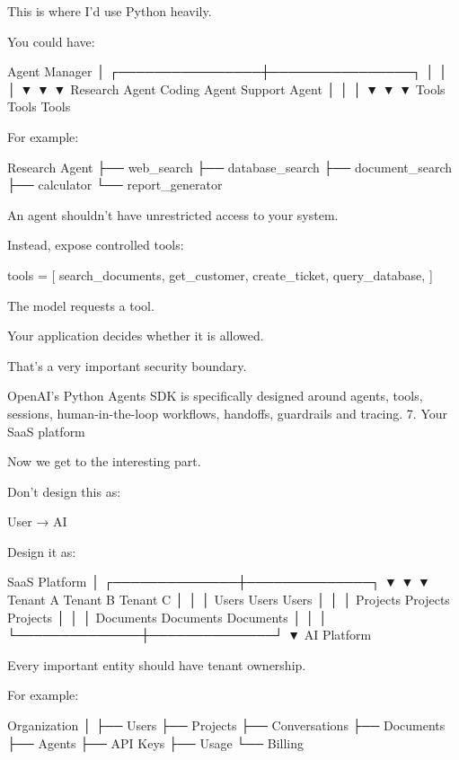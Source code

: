 This is where I'd use Python heavily.

You could have:

                    Agent Manager
                         │
        ┌────────────────┼────────────────┐
        │                │                │
        ▼                ▼                ▼
  Research Agent   Coding Agent     Support Agent
        │                │                │
        ▼                ▼                ▼
     Tools            Tools            Tools

For example:

Research Agent
 ├── web_search
 ├── database_search
 ├── document_search
 ├── calculator
 └── report_generator

An agent shouldn't have unrestricted access to your system.

Instead, expose controlled tools:

tools = [
    search_documents,
    get_customer,
    create_ticket,
    query_database,
]

The model requests a tool.

Your application decides whether it is allowed.

That's a very important security boundary.

OpenAI's Python Agents SDK is specifically designed around agents, tools, sessions, human-in-the-loop workflows, handoffs, guardrails and tracing.
7. Your SaaS platform

Now we get to the interesting part.

Don't design this as:

User → AI

Design it as:

                    SaaS Platform
                         │
          ┌──────────────┼──────────────┐
          ▼              ▼              ▼
       Tenant A       Tenant B       Tenant C
          │              │              │
       Users          Users          Users
          │              │              │
       Projects       Projects       Projects
          │              │              │
       Documents      Documents      Documents
          │              │              │
          └──────────────┼──────────────┘
                         ▼
                    AI Platform

Every important entity should have tenant ownership.

For example:

Organization
    │
    ├── Users
    ├── Projects
    ├── Conversations
    ├── Documents
    ├── Agents
    ├── API Keys
    ├── Usage
    └── Billing

